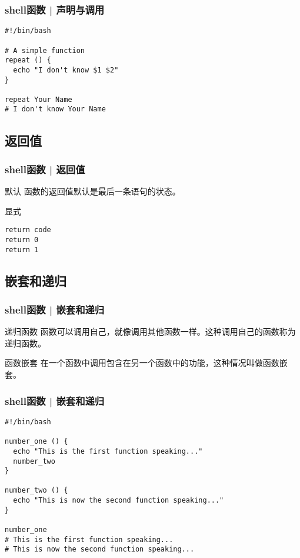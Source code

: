 \begin{frame}[fragile]
  \frametitle{shell函数 | 声明与调用}
\begin{lstlisting}
#!/bin/bash

# A simple function
repeat () {
  echo "I don't know $1 $2"
}

repeat Your Name
# I don't know Your Name
\end{lstlisting}
\end{frame}

\subsection{返回值}
\begin{frame}[fragile]
  \frametitle{shell函数 | \alert{返回值}}
  \begin{block}{默认}
    函数的返回值默认是最后一条语句的状态。
  \end{block}
  \pause
  \begin{block}{显式}
\begin{lstlisting}
return code
return 0 
return 1 
\end{lstlisting}
  \end{block}
\end{frame}

\subsection{嵌套和递归}
\begin{frame}[fragile]
  \frametitle{shell函数 | 嵌套和递归}
  \begin{block}{递归函数}
  函数可以调用自己，就像调用其他函数一样。这种调用自己的函数称为递归函数。
  \end{block}
  \pause
  \begin{block}{函数嵌套}
  在一个函数中调用包含在另一个函数中的功能，这种情况叫做函数嵌套。
  \end{block}
\end{frame}

\begin{frame}[fragile]
  \frametitle{shell函数 | 嵌套和递归}
\begin{lstlisting}
#!/bin/bash

number_one () {
  echo "This is the first function speaking..."
  number_two
}

number_two () {
  echo "This is now the second function speaking..."
}

number_one
# This is the first function speaking...
# This is now the second function speaking...
\end{lstlisting}
\end{frame}


